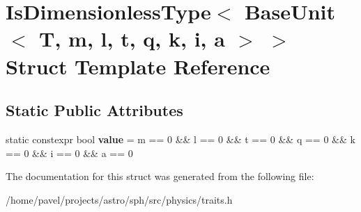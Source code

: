 \hypertarget{structIsDimensionlessType_3_01BaseUnit_3_01T_00_01m_00_01l_00_01t_00_01q_00_01k_00_01i_00_01a_01_4_01_4}{}\section{Is\+Dimensionless\+Type$<$ Base\+Unit$<$ T, m, l, t, q, k, i, a $>$ $>$ Struct Template Reference}
\label{structIsDimensionlessType_3_01BaseUnit_3_01T_00_01m_00_01l_00_01t_00_01q_00_01k_00_01i_00_01a_01_4_01_4}
\subsection*{Static Public Attributes}
\begin{DoxyCompactItemize}
\item 
\hypertarget{structIsDimensionlessType_3_01BaseUnit_3_01T_00_01m_00_01l_00_01t_00_01q_00_01k_00_01i_00_01a_01_4_01_4_abc65385a173741b00512bc478fa46409}{}\label{structIsDimensionlessType_3_01BaseUnit_3_01T_00_01m_00_01l_00_01t_00_01q_00_01k_00_01i_00_01a_01_4_01_4_abc65385a173741b00512bc478fa46409} 
static constexpr bool {\bfseries value} = m == 0 \&\& l == 0 \&\& t == 0 \&\& q == 0 \&\& k == 0 \&\& i == 0 \&\& a == 0
\end{DoxyCompactItemize}


The documentation for this struct was generated from the following file\+:\begin{DoxyCompactItemize}
\item 
/home/pavel/projects/astro/sph/src/physics/traits.\+h\end{DoxyCompactItemize}
